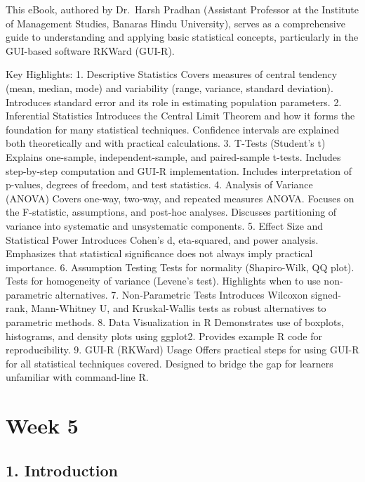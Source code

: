 \documentclass[
  letterpaper,
  DIV=11,
  numbers=noendperiod]{scrreprt}
\begin{document}
This eBook, authored by Dr.~Harsh Pradhan (Assistant Professor at the
Institute of Management Studies, Banaras Hindu University), serves as a
comprehensive guide to understanding and applying basic statistical
concepts, particularly in the GUI-based software RKWard (GUI-R).

Key Highlights: 1. Descriptive Statistics Covers measures of central
tendency (mean, median, mode) and variability (range, variance, standard
deviation). Introduces standard error and its role in estimating
population parameters. 2. Inferential Statistics Introduces the Central
Limit Theorem and how it forms the foundation for many statistical
techniques. Confidence intervals are explained both theoretically and
with practical calculations. 3. T-Tests (Student's t) Explains
one-sample, independent-sample, and paired-sample t-tests. Includes
step-by-step computation and GUI-R implementation. Includes
interpretation of p-values, degrees of freedom, and test statistics. 4.
Analysis of Variance (ANOVA) Covers one-way, two-way, and repeated
measures ANOVA. Focuses on the F-statistic, assumptions, and post-hoc
analyses. Discusses partitioning of variance into systematic and
unsystematic components. 5. Effect Size and Statistical Power Introduces
Cohen's d, eta-squared, and power analysis. Emphasizes that statistical
significance does not always imply practical importance. 6. Assumption
Testing Tests for normality (Shapiro-Wilk, QQ plot). Tests for
homogeneity of variance (Levene's test). Highlights when to use
non-parametric alternatives. 7. Non-Parametric Tests Introduces Wilcoxon
signed-rank, Mann-Whitney U, and Kruskal-Wallis tests as robust
alternatives to parametric methods. 8. Data Visualization in R
Demonstrates use of boxplots, histograms, and density plots using
ggplot2. Provides example R code for reproducibility. 9. GUI-R (RKWard)
Usage Offers practical steps for using GUI-R for all statistical
techniques covered. Designed to bridge the gap for learners unfamiliar
with command-line R.


\chapter{Week 5}\label{week-5}

\section{1. Introduction}\label{introduction-4}
\end{document}
